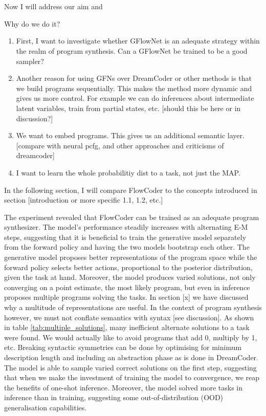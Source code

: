 \section{}
Now I will address our aim and 


Why do we do it?
\begin{enumerate}
    \item First, I want to investigate whether GFlowNet is an adequate strategy within the realm of program synthesis. Can a GFlowNet be trained to be a good sampler?
    \item Another reason for using GFNs over DreamCoder or other methods is that we build programs sequentially. This makes the method more dynamic and gives us more control. For example we can do inferences about intermediate latent variables, train from partial states, etc. [should this be here or in discussion?]
    \item We want to embed programs. This gives us an additional semantic layer. [compare with neural pcfg, and other approaches and criticisms of dreamcoder]
    \item I want to learn the whole probabilitiy dist to a task, not just the MAP.
\end{enumerate}

% 

In the following section, I will compare FlowCoder to the concepts introduced in section [introduction or more specific 1.1, 1.2, etc.]

The experiment revealed that FlowCoder can be trained as an adequate program synthesizer. 
The model's performance steadily increases with alternating E-M steps, suggesting that it is beneficial to train the generative model separately from the forward policy and having the two models bootstrap each other. The generative model proposes better representations of the program space while the forward policy selects better actions, proportional to the posterior distribution, given the task at hand.
Moreover, the model produces varied solutions, not only converging on a point estimate, the most likely program, but even in inference proposes multiple programs solving the tasks. 
In section [x] we have discussed why a multitude of representations are useful. In the context of program synthesis however, we must not conflate semantics with syntax [see discussion]. As shown in table \ref{tab:multiple_solutions}, many inefficient alternate solutions to a task were found. We would actually like to avoid programs that add 0, multiply by 1, etc. Breaking syntactic symmetries can be done by optimising for minimum description length and including an abstraction phase as is done in DreamCoder.
The model is able to sample varied correct solutions on the first step, suggesting that when we make the investment of training the model to convergence, we reap the benefits of one-shot inference.
Moreover, the model solved more tasks in inference than in training, suggesting some out-of-distribution (OOD) generalisation capabilities.


